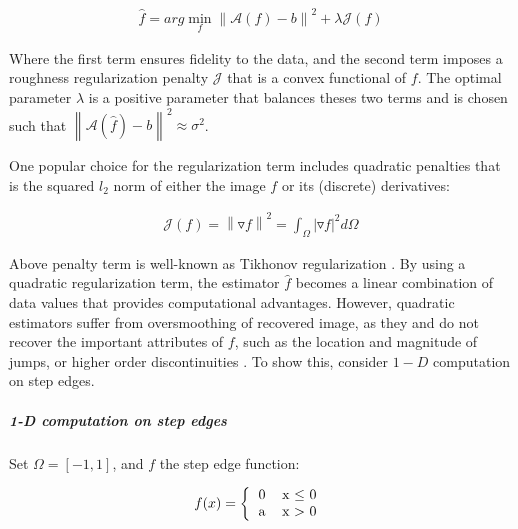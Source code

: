 \begin{equation}
\label{eq:nonweightedregularization}
\begin{gathered}
\widehat{f} = arg\min_{f}\left\|\mathcal{A}(f)-b\right\|^{2} + \lambda\mathcal{J}(f)
\end{gathered}
\end{equation}


Where the first term ensures fidelity to the data, and the second term imposes a roughness regularization penalty $\mathcal{J}$ that is a convex functional of $f$.
The optimal parameter $\lambda$ is a positive parameter that balances theses two terms and is chosen such that $\left\|\mathcal{A}(\hat{f})-b\right\|^{2} \approx \sigma^{2}$.

One popular choice for the regularization term includes quadratic penalties \cite{tikhonov1943stability} that is the squared $l_{2}$ norm of either the image $f$ or its (discrete) derivatives:

\begin{equation}
\begin{gathered}
\mathcal{J}(f) = \left\|\triangledown f\right\|^{2} = \int_{\Omega} |\triangledown f|^2 d\Omega
\end{gathered}
\end{equation}

Above penalty term is well-known as Tikhonov regularization \cite{tikhonov1977solutions}. By using a quadratic regularization term, the estimator $\widehat{f}$ becomes a linear combination of data values that provides computational advantages. However, quadratic estimators suffer from oversmoothing of recovered image, as they and do not recover the important attributes of $f$, such as the location and magnitude of jumps, or higher order discontinuities \cite{geman95}. To show this, consider $1-D$ computation on step edges.

\subparagraph{1-D computation on step edges} %
Set $\Omega = [-1,1]$, and $f$ the step edge function:

\begin{equation}
\begin{gathered}
f(x) =
\left \{
  \begin{tabular}{cc}
  0 & x $\leq$ 0 \\
  a & x $>$ 0
  \end{tabular}
\right.
\end{gathered}
\end{equation}

